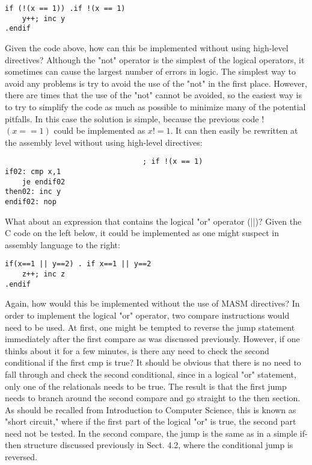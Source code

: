 \documentclass[10pt]{article}
\begin{document}
\begin{verbatim}
if (!(x == 1)) .if !(x == 1)
    y++; inc y
.endif
\end{verbatim}

Given the code above, how can this be implemented without using high-level directives? Although the "not" operator is the simplest of the logical operators, it sometimes can cause the largest number of errors in logic. The simplest way to avoid any problems is try to avoid the use of the "not" in the first place. However, there are times that the use of the "not" cannot be avoided, so the easiest way is to try to simplify the code as much as possible to minimize many of the potential pitfalls. In this case the solution is simple, because the previous code ! $(x==1)$ could be implemented as $x!=1$. It can then easily be rewritten at the assembly level without using high-level directives:

\begin{verbatim}
                                ; if !(x == 1)
if02: cmp x,1
    je endif02
then02: inc y
endif02: nop
\end{verbatim}

What about an expression that contains the logical "or" operator (||)? Given the C code on the left below, it could be implemented as one might suspect in assembly language to the right:

\begin{verbatim}
if(x==1 || y==2) . if x==1 || y==2
    z++; inc z
.endif
\end{verbatim}

Again, how would this be implemented without the use of MASM directives? In order to implement the logical "or" operator, two compare instructions would need to be used. At first, one might be tempted to reverse the jump statement immediately after the first compare as was discussed previously. However, if one thinks about it for a few minutes, is there any need to check the second conditional if the first cmp is true? It should be obvious that there is no need to fall through and check the second conditional, since in a logical "or" statement, only one of the relationals needs to be true. The result is that the first jump needs to branch around the second compare and go straight to the then section. As should be recalled from Introduction to Computer Science, this is known as "short circuit," where if the first part of the logical "or" is true, the second part need not be tested. In the second compare, the jump is the same as in a simple if-then structure discussed previously in Sect. 4.2, where the conditional jump is reversed.
\end{document}
